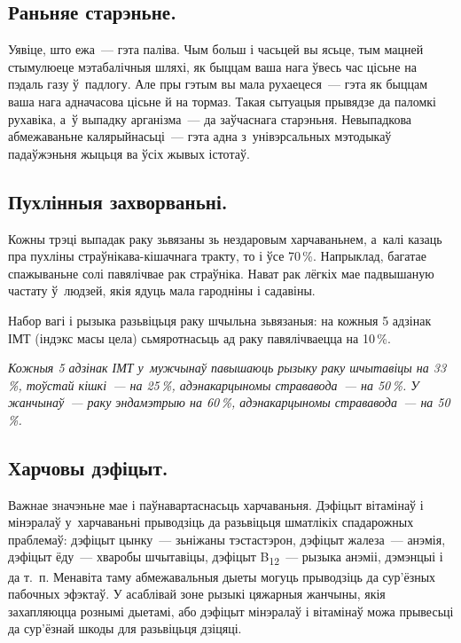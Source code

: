
\subsection*{Раньняе старэньне.} 
Уявіце, што ежа~--- гэта паліва. Чым больш і часьцей вы ясьце, тым мацней стымулюеце мэтабалічныя шляхі, як быццам ваша нага ўвесь час цісьне на пэдаль газу ў~падлогу. Але пры гэтым вы мала рухаецеся~--- гэта як быццам ваша нага адначасова цісьне й на тормаз. Такая сытуацыя прывядзе да паломкі рухавіка, а~ў выпадку арганізма~--- да заўчаснага старэньня. Невыпадкова абмежаваньне калярыйнасьці~--- гэта адна з~унівэрсальных мэтодыкаў падаўжэньня жыцьця ва ўсіх жывых істотаў.

\subsection*{Пухлінныя захворваньні.} 
Кожны трэці выпадак раку зьвязаны зь нездаровым харчаваньнем, а~калі казаць пра пухліны страўнікава-кішачнага тракту, то і ўсе 70\,\%. Напрыклад, багатае спажываньне солі павялічвае рак страўніка. Нават рак лёгкіх мае падвышаную частату ў~людзей, якія ядуць мала гародніны і садавіны.

Набор вагі і рызыка разьвіцьця раку шчыльна зьвязаныя: на кожныя 5 адзінак ІМТ (індэкс масы цела) сьмяротнасьць ад раку павялічваецца на 10\,\%. 

\emph{Кожныя 5 адзінак ІМТ у~мужчынаў павышаюць рызыку раку шчытавіцы на 33\,\%, тоўстай кішкі~--- на 25\,\%, адэнакарцыномы стрававода~--- на 50\,\%. У жанчынаў~--- раку эндамэтрыю на 60\,\%, адэнакарцыномы стрававода~--- на 50\,\%.}

\subsection*{Харчовы дэфіцыт.} 

Важнае значэньне мае і паўнавартаснасьць харчаваньня. Дэфіцыт вітамінаў і мінэралаў у~харчаваньні прыводзіць да разьвіцьця шматлікіх спадарожных праблемаў: дэфіцыт цынку~--- зьніжаны тэстастэрон, дэфіцыт жалеза~--- анэмія, дэфіцыт ёду~--- хваробы шчытавіцы, дэфіцыт B\textsubscript{12}~--- рызыка анэміі, дэмэнцыі і да т.~п. Менавіта таму абмежавальныя дыеты могуць прыводзіць да сур'ёзных пабочных эфэктаў. У асаблівай зоне рызыкі цяжарныя жанчыны, якія захапляюцца рознымі дыетамі, або дэфіцыт мінэралаў і вітамінаў можа прывесьці да сур'ёзнай шкоды для разьвіцьця дзіцяці.

